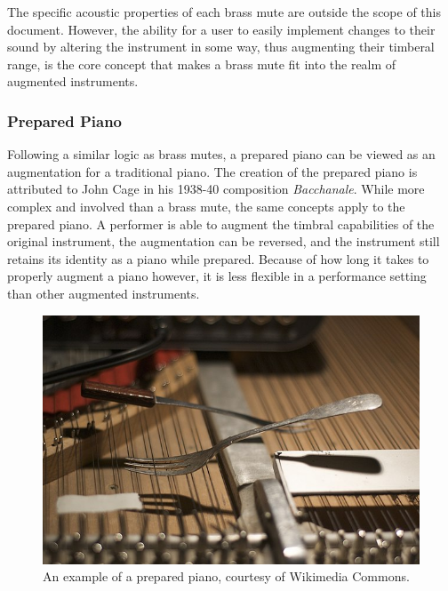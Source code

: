 The specific acoustic properties of each brass mute are outside the scope of this document. However, the ability for a user to easily implement changes to their sound by altering the instrument in some way, thus augmenting their timberal range, is the core concept that makes a brass mute fit into the realm of augmented instruments.

\subsubsection{Prepared Piano}

Following a similar logic as brass mutes, a prepared piano can be viewed as an augmentation for a traditional piano. The creation of the prepared piano is attributed to John Cage in his 1938-40 composition \textit{Bacchanale}. While more complex and involved than a brass mute, the same concepts apply to the prepared piano. A performer is able to augment the timbral capabilities of the original instrument, the augmentation can be reversed, and the instrument still retains its identity as a piano while prepared. Because of how long it takes to properly augment a piano however, it is less flexible in a performance setting than other augmented instruments. 

\begin{figure}
    \centering
    \includegraphics[scale=0.5]{diagrams/Prepared_piano_board_Neumann.jpg}
    \caption{An example of a prepared piano, courtesy of Wikimedia Commons.} %
    \label{fig:pp}
\end{figure}

